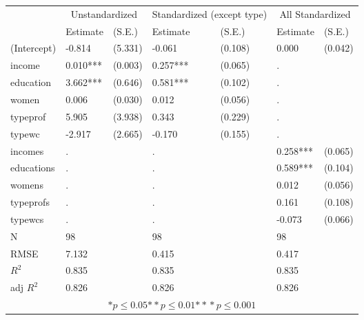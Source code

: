 \begin{tabular}{*{7}{l}}
\hline
                  & \multicolumn{2}{c}{Unstandardized} & \multicolumn{2}{c}{Standardized (except type)} & \multicolumn{2}{c}{All Standardized}   \tabularnewline
                   &Estimate  &(S.E.)    &Estimate  &(S.E.)    &Estimate  &(S.E.)  \tabularnewline
 \hline
 \hline
   (Intercept)     &-0.814   &   (5.331) &-0.061   &   (0.108) &0.000   &   (0.042) \tabularnewline
   income          &0.010***   &   (0.003) &0.257***   &   (0.065)   & .        &         \tabularnewline
   education       &3.662***   &   (0.646) &0.581***   &   (0.102)   & .        &         \tabularnewline
   women           &0.006   &   (0.030) &0.012   &   (0.056)   & .        &         \tabularnewline
   typeprof        &5.905   &   (3.938) &0.343   &   (0.229)   & .        &         \tabularnewline
   typewc          &-2.917   &   (2.665) &-0.170   &   (0.155)   & .        &         \tabularnewline
   incomes           & .        &           & .        &         &0.258***   &   (0.065) \tabularnewline
   educations        & .        &           & .        &         &0.589***   &   (0.104) \tabularnewline
   womens            & .        &           & .        &         &0.012   &   (0.056) \tabularnewline
   typeprofs         & .        &           & .        &         &0.161   &   (0.108) \tabularnewline
   typewcs           & .        &           & .        &         &-0.073   &   (0.066) \tabularnewline
 \hline
 N                 &98       &        &98       &        &98       &        \tabularnewline
 RMSE             &7.132         & &0.415         & &0.417         & \tabularnewline
 $R^2$             &0.835         & &0.835         & &0.835         & \tabularnewline
 adj $R^2$         &0.826         & &0.826         & &0.826         & \tabularnewline
 \hline
\hline
 
 \multicolumn{7}{c}{${*  p}\le 0.05$${*\!\!*  p}\le 0.01$${*\!\!*\!\!*  p}\le 0.001$}\tabularnewline
 \end{tabular}